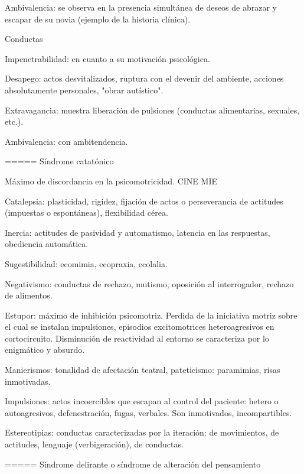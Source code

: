 Ambivalencia: se observa en la presencia simultánea de deseos de abrazar y escapar de su novia (ejemplo de la historia clínica).

Conductas

Impenetrabilidad: en cuanto a su motivación psicológica.

Desapego: actos desvitalizados, ruptura con el devenir del ambiente, acciones absolutamente personales, "obrar autístico".

Extravagancia: muestra liberación de pulsiones (conductas alimentarias, sexuales, etc.).

Ambivalencia: con ambitendencia.

===== Síndrome catatónico

Máximo de discordancia en la psicomotricidad. CINE MIE

Catalepsia: plasticidad, rigidez, fijación de actos o perseverancia de actitudes (impuestas o espontáneas), flexibilidad cérea.

Inercia: actitudes de pasividad y automatismo, latencia en las respuestas, obediencia automática.

Sugestibilidad: ecomimia, ecopraxia, ecolalia.

Negativismo: conductas de rechazo, mutismo, oposición al interrogador, rechazo de alimentos.

Estupor: máximo de inhibición psicomotriz. Perdida de la iniciativa motriz sobre el cual se instalan impulsiones, episodios excitomotrices heteroagresivos en cortocircuito. Disminución de reactividad al entorno se caracteriza por lo enigmático y absurdo.

Manierismos: tonalidad de afectación teatral, pateticismo: paramimias, risas inmotivadas.

Impulsiones: actos incoercibles que escapan al control del paciente: hetero o autoagresivos, defenestración, fugas, verbales. Son inmotivados, incompartibles.

Estereotipias: conductas caracterizadas por la iteración: de movimientos, de actitudes, lenguaje (verbigeración), de conductas.

===== Síndrome delirante o síndrome de alteración del pensamiento

